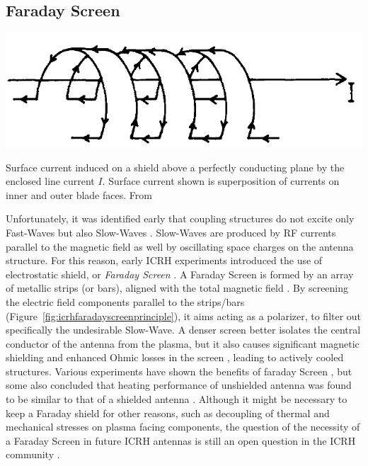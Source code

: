 
\subsection{Faraday Screen}
\begin{marginfigure}
	\centering
	\includegraphics[width=1.0\linewidth]{figures/chap3/WEST_ICRH/ICRH_Faraday_Screen_Principle}
	\caption{Surface current induced on a shield above a perfectly conducting plane by the enclosed line current $I$. Surface current shown is superposition of currents on inner and outer blade faces. From \cite{faulconer1983}}
	\label{fig:icrhfaradayscreenprinciple}
\end{marginfigure}

Unfortunately, it was identified early that coupling structures do not excite only Fast-Waves but also Slow-Waves . Slow-Waves are produced by RF currents parallel to the magnetic field as well by oscillating space charges on the antenna structure. For this reason, early ICRH experiments introduced the use of electrostatic shield, or \textit{Faraday Screen} . A Faraday Screen is formed by an array of metallic strips (or bars), aligned with the total magnetic field . By screening the electric field components parallel to the strips/bars (Figure~\ref{fig:icrhfaradayscreenprinciple}), it aims acting as a polarizer, to filter out specifically the undesirable Slow-Wave. A denser screen better isolates the central conductor of the antenna from the plasma, but it also causes significant magnetic shielding and enhanced Ohmic losses in the screen , leading to actively cooled structures. Various experiments have shown the benefits of faraday Screen , but some also concluded that heating performance of unshielded antenna was found to be similar to that of a shielded antenna .  Although it might be necessary to keep a Faraday shield for other reasons, such as decoupling of thermal and mechanical stresses on plasma facing components, the question of the necessity of a Faraday Screen in future ICRH antennas is still an open question in the ICRH community . 



